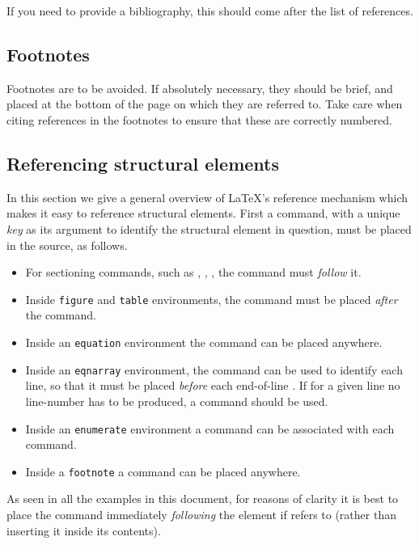 \documentclass[12pt,twoside,a4paper]{cernrep}
\begin{document}
If you need to provide a bibliography, this should come after the list
of references.

\subsection{Footnotes}

Footnotes are to be avoided. If absolutely necessary, they should be
brief, and placed at the bottom of the page on which they are referred
to. Take care when citing references in the footnotes to ensure that
these are correctly numbered.

\subsection{Referencing structural elements}
\label{sec:crossref}

In this section we give a general overview of \LaTeX's reference
mechanism which makes it easy to reference structural elements. First
a  command, with a unique \emph{key} as its argument to
identify the structural element in question, must be placed in the
source, as follows.

\begin{itemize}
\item For sectioning commands, such as ,
      , , the  command
      must \emph{follow} it.
\item Inside \texttt{figure} and \texttt{table} environments, the 
       command must be placed \emph{after} the 
      command.
\item Inside an \texttt{equation} environment the  command
      can be placed anywhere.
\item Inside an \texttt{eqnarray} environment, the  command
      can be used to identify each line, so that it must be placed
      \emph{before} each end-of-line \Lcs{\bs}. If for a given line no
      line-number has to be produced, a  command should
      be used.
\item Inside an \texttt{enumerate} environment a  command
      can be associated with each  command.
\item Inside a \texttt{footnote} a  command can be placed
      anywhere.
\end{itemize}
As seen in all the examples in this document, for reasons of clarity
it is best to place the  command immediately
\emph{following} the element if refers to (rather than inserting it
inside its contents).
\end{document}
